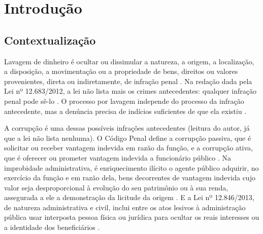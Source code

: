 \begingroup
\setlength{\emergencystretch}{3em}

\chapter{Introdução}
\label{cap:introducao}

\section{Contextualização}
\label{sec:intro-contexto}

Lavagem de dinheiro é ocultar ou dissimular a natureza, a origem, a
localização, a disposição, a movimentação ou a propriedade de bens, direitos
ou valores provenientes, direta ou indiretamente, de infração penal
\cite[art. 1º]{brasil1998lei9613}. Na redação dada pela Lei nº 12.683/2012,
a lei não lista mais os crimes antecedentes: qualquer infração penal pode
sê-lo \cite[art. 1º]{brasil1998lei9613}. O processo por lavagem independe do
processo da infração antecedente, mas a denúncia precisa de indícios
suficientes de que ela existiu \cite[art. 2º, II e § 1º]{brasil1998lei9613}.

A corrupção é uma dessas possíveis infrações antecedentes (leitura do autor,
já que a lei não lista nenhuma). O Código Penal define a corrupção passiva,
que é solicitar ou receber vantagem indevida em razão da função, e a
corrupção ativa, que é oferecer ou prometer vantagem indevida a funcionário
público \cite[arts. 317 e 333]{brasil1940codigopenal}. Na improbidade
administrativa, é enriquecimento ilícito o agente público adquirir, no
exercício da função e em razão dela, bens decorrentes de vantagem indevida
cujo valor seja desproporcional à evolução do seu patrimônio ou à sua renda,
assegurada a ele a demonstração da licitude da origem
\cite[art. 9º, VII]{brasil1992lei8429}. E a Lei nº 12.846/2013, de natureza
administrativa e civil, inclui entre os atos lesivos à administração pública
usar interposta pessoa física ou jurídica para ocultar os reais interesses ou
a identidade dos beneficiários \cite[art. 5º, III]{brasil2013lei12846}.

